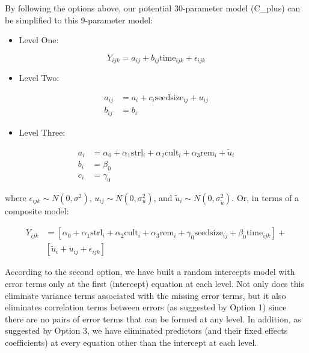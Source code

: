 \documentclass[
]{krantz}
\providecommand{\tightlist}{%
  \setlength{\itemsep}{0pt}\setlength{\parskip}{0pt}}
\begin{document}
By following the options above, our potential 30-parameter model (C\_plus) can be simplified to this 9-parameter model:

\begin{itemize}
\tightlist
\item
  Level One:
\end{itemize}

\begin{equation*}
Y_{ijk} = a_{ij}+b_{ij}\textrm{time}_{ijk}+\epsilon_{ijk}
\end{equation*}

\begin{itemize}
\tightlist
\item
  Level Two:
\end{itemize}

\begin{align*}
a_{ij} & = a_{i}+c_{i}\textrm{seedsize}_{ij}+u_{ij} \\
b_{ij} & = b_{i}
\end{align*}

\begin{itemize}
\tightlist
\item
  Level Three:
\end{itemize}

\begin{align*}
a_{i} & = \alpha_{0} + \alpha_{1}\textrm{strl}_{i} + \alpha_{2}\textrm{cult}_{i} + \alpha_{3}\textrm{rem}_{i} + \tilde{u}_{i} \\
b_{i} & = \beta_{0} \\
c_{i} & = \gamma_{0}
\end{align*}

where \(\epsilon_{ijk}\sim N(0,\sigma^2)\), \(u_{ij}\sim N(0,\sigma_{u}^{2})\), and \(\tilde{u}_{i}\sim N(0,\sigma_{\tilde{u}}^{2})\). Or, in terms of a composite model:

\begin{align*}
Y_{ijk} & = [\alpha_{0}+\alpha_{1}\textrm{strl}_{i}+\alpha_{2}\textrm{cult}_{i}+\alpha_{3}\textrm{rem}_{i} +
 \gamma_{0}\textrm{seedsize}_{ij} + \beta_{0}\textrm{time}_{ijk}] + \\
 &  [\tilde{u}_{i}+u_{ij}+\epsilon_{ijk}]
\end{align*}

According to the second option, we have built a random intercepts model with error terms only at the first (intercept) equation at each level. Not only does this eliminate variance terms associated with the missing error terms, but it also eliminates correlation terms between errors (as suggested by Option 1) since there are no pairs of error terms that can be formed at any level. In addition, as suggested by Option 3, we have eliminated predictors (and their fixed effects coefficients) at every equation other than the intercept at each level.
\end{document}
